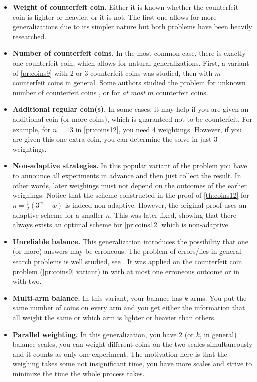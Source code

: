 \begin{itemize}
\item \textbf{Weight of counterfeit coin.}
  Either it is known whether the counterfeit coin is lighter or heavier,
  or it is not.
  The first one allows for more generalizations due to its simpler nature
  but both problems have been heavily researched.
\item \textbf{Number of counterfeit coins.}
  In the most common case, there is exactly one counterfeit coin,
    which allows for natural generalizations.
  First, a variant of \autoref{pr:coins9} with 2 or 3 counterfeit coins
   was studied\cite{coins-2fakes}\cite{coins-3fakes},
  then with $m$ counterfeit coins in general\cite{coins-mfakes}.
  Some authors studied the problem for unknown number of counterfeit coins
  \cite{coins-unknownfakes},
  or for \emph{at most} $m$ counterfeit coins\cite{coins-atmostfakes}.
\item \textbf{Additional regular coin(s).}
  In some cases, it may help if you are given an additional coin (or more coins),
    which is guaranteed not to be counterfeit.
  For example, for $n = 13$ in \autoref{pr:coins12}, you need 4 weightings.
  However, if you are given this one extra coin, you can determine the
    solve in just 3 weightings\cite{coins-dyson1946}.
\item \textbf{Non-adaptive strategies.}
  In this popular variant of the problem you have to announce all experiments
    in advance and then just collect the result.
  In other words, later weighings must not depend on the outcomes of the earlier weighings.
  Notice that the scheme constructed in the proof of \autoref{th:coins12} for
  $n = \frac{1}{2}(3^w - w)$ is indeed non-adaptive.
  However, the original proof uses an adaptive scheme for a smaller $n$.
  This was later fixed, showing that there always exists an optimal scheme for
  \autoref{pr:coins12} which is non-adaptive\cite{coins-nonadaptive}.
\item \textbf{Unreliable balance.}
  This generalization introduces the possibility that
  one (or more) answers may be erroneous.
  The problem of errors/lies in general search problems is well studied,
    see \cite{games-lies}.
  It was applied on the counterfeit coin problem (\autoref{pr:coins9} variant)
  in \cite{coins-unreliable} with at most one erroneous outcome or in
  \cite{coins-unreliable} with two.
\item \textbf{Multi-arm balance.}
  In this variant, your balance has $k$ arms. You put the same number of coins
  on every arm and you get either the information that all
  weight the same or which arm is lighter or heavier
  than others\cite{coins-multiplearm}.
\item \textbf{Parallel weighting.}
  In this generalization, you have 2 (or $k$, in general)
    balance scales, you can weight different coins on
    the two scales simultaneously and it counts
    as only one experiment\cite{coins-parallel}.
  The motivation here is that the weighing takes some not insignificant time,
  you have more scales and strive to minimize the time the whole process takes.
\end{itemize}

